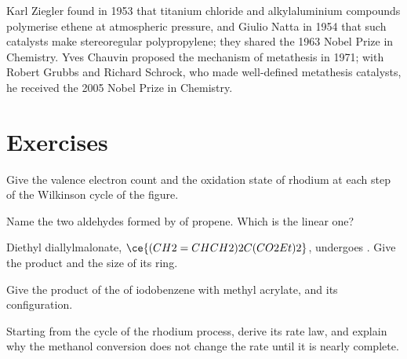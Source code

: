 \begin{history}
Karl Ziegler found in 1953 that titanium chloride and alkylaluminium compounds
polymerise ethene at atmospheric pressure, and Giulio Natta in 1954 that such
catalysts make stereoregular polypropylene; they shared the 1963 Nobel Prize in
Chemistry. Yves Chauvin proposed the  mechanism of
metathesis in 1971; with Robert Grubbs and Richard Schrock, who made well-defined
metathesis catalysts, he received the 2005 Nobel Prize in Chemistry.
\end{history}

\section{Exercises}

\begin{exercise}[$\star$]\label{exo:b3:homogeneous-catalysis:1}
Give the valence electron count and the oxidation state of rhodium at each step
of the Wilkinson cycle of the figure.
\end{exercise}

\begin{exercise}[$\star$]\label{exo:b3:homogeneous-catalysis:2}
Name the two aldehydes formed by  of propene. Which is the linear
one?
\end{exercise}

\begin{exercise}[$\star$]\label{exo:b3:homogeneous-catalysis:3}
Diethyl diallylmalonate, $\ce{(CH2=CHCH2)2C(CO2Et)2}$, undergoes .
Give the product and the size of its ring.
\end{exercise}

\begin{exercise}[$\star$]\label{exo:b3:homogeneous-catalysis:4}
Give the product of the  of iodobenzene with methyl acrylate, and its
configuration.
\end{exercise}

\begin{exercise}[$\star\star$]\label{exo:b3:homogeneous-catalysis:5}
Starting from the cycle of the rhodium process, derive its rate law, and explain
why the methanol conversion does not change the rate until it is nearly complete.
\end{exercise}

